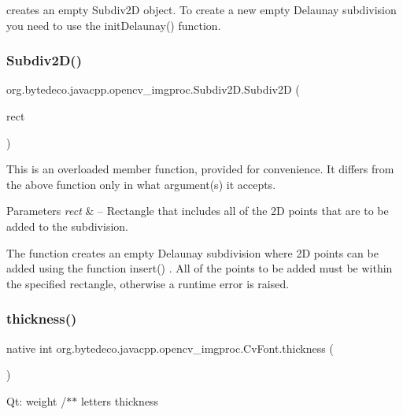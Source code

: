 creates an empty Subdiv2D object. To create a new empty Delaunay subdivision you need to use the init\+Delaunay() function. \mbox{\label{group__imgproc_ga07dbdb939b272f64ee69ec85f251b92d}} 
\subsubsection{\texorpdfstring{Subdiv2\+D()}{Subdiv2D()}\hspace{0.1cm}{\footnotesize\ttfamily [4/4]}}
{\footnotesize\ttfamily org.\+bytedeco.\+javacpp.\+opencv\+\_\+imgproc.\+Subdiv2\+D.\+Subdiv2D (\begin{DoxyParamCaption}\item[{@By\+Val Rect}]{rect }\end{DoxyParamCaption})\hspace{0.3cm}{\ttfamily [inline]}}

This is an overloaded member function, provided for convenience. It differs from the above function only in what argument(s) it accepts. 


\begin{DoxyParams}{Parameters}
{\em rect} & – Rectangle that includes all of the 2D points that are to be added to the subdivision. \\
\hline
\end{DoxyParams}
The function creates an empty Delaunay subdivision where 2D points can be added using the function insert() . All of the points to be added must be within the specified rectangle, otherwise a runtime error is raised. \mbox{\label{group__imgproc_ga598e4433b73866dbddf63fed41e2a5ed}} 
\subsubsection{\texorpdfstring{thickness()}{thickness()}}
{\footnotesize\ttfamily native int org.\+bytedeco.\+javacpp.\+opencv\+\_\+imgproc.\+Cv\+Font.\+thickness (\begin{DoxyParamCaption}{ }\end{DoxyParamCaption})}

Qt\+: weight /$\ast$$\ast$ letters thickness \mbox{\label{group__imgproc_ga16cecb494a3d7f7784b053b6d9348d29}} 
